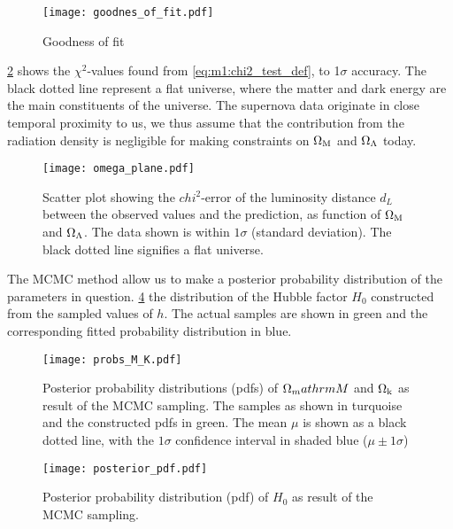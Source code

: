     \begin{figure}
        \texttt{[image: goodnes\_of\_fit.pdf]}
        \caption{Goodness of fit}
        \label{fig:m1:goodness_of_fit}
    \end{figure}

    \cref{fig:m1:omega_planes} shows the $\chi^2$-values found from \cref{eq:m1:chi2_test_def}, to 1$\sigma$ accuracy. The black dotted line represent a flat universe, where the matter and dark energy are the main constituents of the universe. The supernova data originate in close temporal proximity to us, we thus assume that the contribution from the radiation density is negligible for making constraints on $\Omega_\mathrm{M}$ and $\Omega_\Lambda$ today. 

    \begin{figure}
        \texttt{[image: omega\_plane.pdf]}
        \caption{Scatter plot showing the $chi^2$-error of the luminosity distance $d_L$ between the observed values and the prediction, as function of $\Omega_\mathrm{M}$ and $\Omega_\Lambda$. The data shown is within $1\sigma$ (standard deviation). The black dotted line signifies a flat universe. }
        \label{fig:m1:omega_planes}
    \end{figure}

    The MCMC method allow us to make a posterior probability distribution of the parameters in question. \cref{fig:m1:posterior_pdf_H0} the distribution of the Hubble factor $H_0$ constructed from the sampled values of $h$. The actual samples are shown in green and the corresponding fitted probability distribution in blue. 


    \begin{figure}
        \texttt{[image: probs\_M\_K.pdf]}
        \caption{Posterior probability distributions (pdfs) of $\Omega_mathrm{M}$ and $\Omega_\mathrm{k}$ as result of the MCMC sampling. The samples as shown in turquoise and the constructed pdfs in green. The mean $\mu$ is shown as a black dotted line, with the $1\sigma$ confidence interval in shaded blue ($\mu\pm 1\sigma$)}
        \label{fig:m1:posterior_pdf_omega_m_k}
    \end{figure}

    \begin{figure}
        \texttt{[image: posterior\_pdf.pdf]}
        \caption{Posterior probability distribution (pdf) of $H_0$ as result of the MCMC sampling.}
        \label{fig:m1:posterior_pdf_H0}
    \end{figure}

